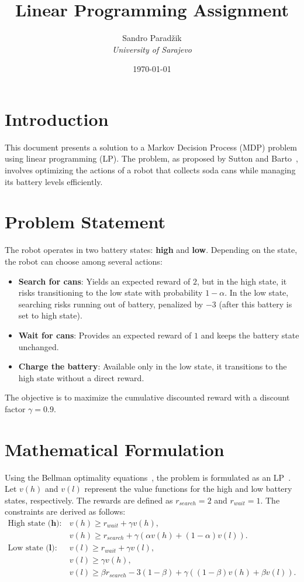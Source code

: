 \documentclass[12pt,a4paper]{article}
\title{\textbf{Linear Programming Assignment}}
\author{Sandro Paradžik \\
        \textit{University of Sarajevo}}
\date{\today}
\begin{document}
\maketitle

\section{Introduction}
This document presents a solution to a Markov Decision Process (MDP) problem using linear programming (LP). The problem, as proposed by Sutton and Barto~\cite{SuttonBarto2018}, involves optimizing the actions of a robot that collects soda cans while managing its battery levels efficiently.


\section{Problem Statement}
The robot operates in two battery states: \textbf{high} and \textbf{low}. Depending on the state, the robot can choose among several actions:
\begin{itemize}
    \item \textbf{Search for cans}: Yields an expected reward of $2$, but in the high state, it risks transitioning to the low state with probability $1 - \alpha$. In the low state, searching risks running out of battery, penalized by $-3$ (after this battery is set to high state).
    \item \textbf{Wait for cans}: Provides an expected reward of $1$ and keeps the battery state unchanged.
    \item \textbf{Charge the battery}: Available only in the low state, it transitions to the high state without a direct reward.
\end{itemize}

The objective is to maximize the cumulative discounted reward with a discount factor $\gamma = 0.9$.

\section{Mathematical Formulation}
Using the Bellman optimality equations~\cite{SuttonBarto2018}, the problem is formulated as an LP~\cite{HelmertRoger2021}. Let $v(h)$ and $v(l)$ represent the value functions for the high and low battery states, respectively. The rewards are defined as $r_{search} = 2$ and $r_{wait} = 1$. The constraints are derived as follows:
\begin{align*}
    \text{High state (}\mathbf{h}\text{):}\quad & v(h) \geq r_{wait} + \gamma v(h), \\
    & v(h) \geq r_{search} + \gamma \left( \alpha v(h) + (1 - \alpha)v(l) \right). \\
    \text{Low state (}\mathbf{l}\text{):}\quad & v(l) \geq r_{wait} + \gamma v(l), \\
    & v(l) \geq \gamma v(h), \\
    & v(l) \geq \beta r_{search} - 3(1 - \beta) + \gamma \left( (1 - \beta)v(h) + \beta v(l) \right).
\end{align*}
\end{document}
